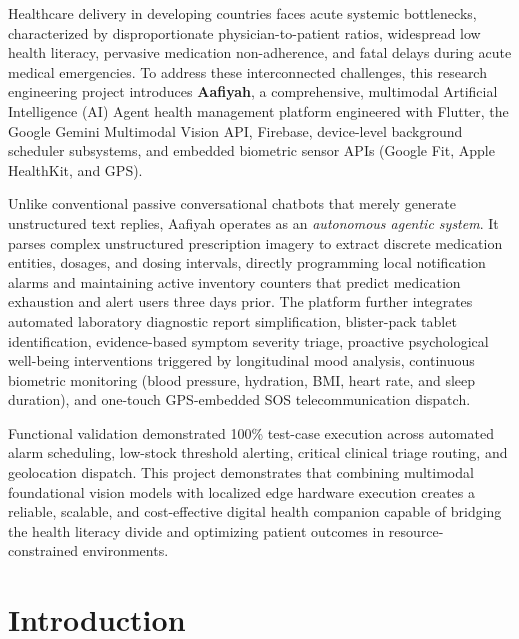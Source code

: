 \documentclass[12pt,a4paper,oneside]{report}
\begin{document}
\begin{highlightbox}[title=Scientific Abstract]
Healthcare delivery in developing countries faces acute systemic bottlenecks, characterized by disproportionate physician-to-patient ratios, widespread low health literacy, pervasive medication non-adherence, and fatal delays during acute medical emergencies. To address these interconnected challenges, this research engineering project introduces \textbf{Aafiyah}, a comprehensive, multimodal Artificial Intelligence (AI) Agent health management platform engineered with Flutter, the Google Gemini Multimodal Vision API, Firebase, device-level background scheduler subsystems, and embedded biometric sensor APIs (Google Fit, Apple HealthKit, and GPS).

Unlike conventional passive conversational chatbots that merely generate unstructured text replies, Aafiyah operates as an \textit{autonomous agentic system}. It parses complex unstructured prescription imagery to extract discrete medication entities, dosages, and dosing intervals, directly programming local notification alarms and maintaining active inventory counters that predict medication exhaustion and alert users three days prior. The platform further integrates automated laboratory diagnostic report simplification, blister-pack tablet identification, evidence-based symptom severity triage, proactive psychological well-being interventions triggered by longitudinal mood analysis, continuous biometric monitoring (blood pressure, hydration, BMI, heart rate, and sleep duration), and one-touch GPS-embedded SOS telecommunication dispatch. 

Functional validation demonstrated 100\% test-case execution across automated alarm scheduling, low-stock threshold alerting, critical clinical triage routing, and geolocation dispatch. This project demonstrates that combining multimodal foundational vision models with localized edge hardware execution creates a reliable, scalable, and cost-effective digital health companion capable of bridging the health literacy divide and optimizing patient outcomes in resource-constrained environments.
\end{highlightbox}

\chapter{Introduction}
\end{document}
